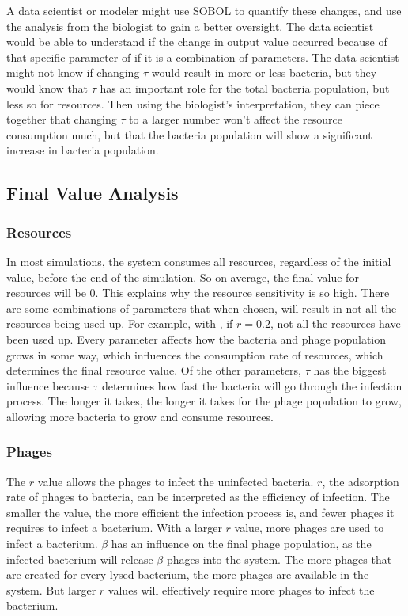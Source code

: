 A data scientist or modeler might use SOBOL to quantify these changes, and use the analysis from the biologist to gain a better oversight. 
The data scientist would be able to understand if the change in output value occurred because of that specific parameter of if it is a combination of parameters. 
The data scientist might not know if changing $\tau$ would result in more or less bacteria, but they would know that $\tau$ has an important role for the total bacteria population, but less so for resources. 
Then using the biologist's interpretation, they can piece together that changing $\tau$ to a larger number won't affect the resource consumption much, but that the bacteria population will show a significant increase in bacteria population. 

\subsection{Final Value Analysis}
\subsubsection{Resources}
In most simulations, the system consumes all resources, regardless of the initial value, before the end of the simulation.
So on average, the final value for resources will be 0. 
This explains why the resource sensitivity is so high. 
There are some combinations of parameters that when chosen, will result in not all the resources being used up. 
For example, with , if $r=0.2$, not all the resources have been used up. 
Every parameter affects how the bacteria and phage population grows in some way, which influences the consumption rate of resources, which determines the final resource value. 
Of the other parameters, $\tau$ has the biggest influence because $\tau$ determines how fast the bacteria will go through the infection process. 
The longer it takes, the longer it takes for the phage population to grow, allowing more bacteria to grow and consume resources. 

\subsubsection{Phages}
The $r$ value allows the phages to infect the uninfected bacteria. 
$r$, the adsorption rate of phages to bacteria, can be interpreted as the efficiency of infection. 
The smaller the value, the more efficient the infection process is, and fewer phages it requires to infect a bacterium. 
With a larger $r$ value, more phages are used to infect a bacterium. 
$\beta$ has an influence on the final phage population, as the infected bacterium will release $\beta$ phages into the system. 
The more phages that are created for every lysed bacterium, the more phages are available in the system. 
But larger $r$ values will effectively require more phages to infect the bacterium. 

